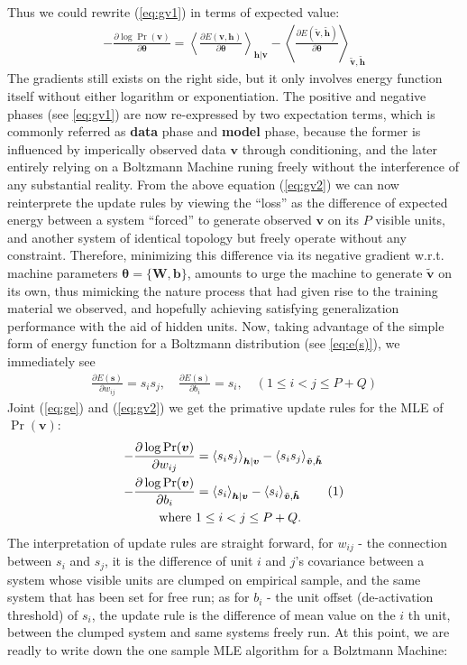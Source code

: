 \documentclass[11pt]{article}
\newcommand{\mean}[2]{\left\langle{#1}\right\rangle_{#2}}
\newcommand\numberthis{\addtocounter{equation}{1}\tag{\theequation}}
\newcommand{\vb}{\boldsymbol{b}}
\newcommand{\vh}{\boldsymbol{h}}
\newcommand{\vv}{\boldsymbol{v}}
\newcommand{\vs}{\boldsymbol{s}}
\newcommand{\mw}{\boldsymbol{W}}
\newcommand{\vht}{\tilde{\vh}}
\newcommand{\vvt}{\tilde{\vv}}
\newcommand{\pEC}{\boldsymbol{\theta}}
\newcommand{\PDV}[2]{\frac{\partial #1}{\partial #2}}
\begin{document}
Thus we could rewrite ({\ref{eq:gv1}) in terms of expected value:
\begin{align} \label{eq:gv2}
  -\PDV{\log{\Pr(\vv)}}{\pEC} = \mean{\PDV{E(\vv, \vh)}{\pEC}}{\vh|\vv} - \mean{\PDV{E(\vvt, \vht)}{\pEC}}{\vvt, \vht}
\end{align}
The gradients still exists on the right side, but it only involves energy function itself without either logarithm or exponentiation. The positive and negative phases (see \ref{eq:gv1}) are now re-expressed by two expectation terms, which is commonly referred as \textbf{data} phase and \textbf{model} phase, because the former is influenced by imperically observed data $\vv$ through conditioning, and the later entirely relying on a Boltzmann Machine runing freely without the interference of any substantial reality. From the above equation (\ref{eq:gv2}) we can now reinterprete the update rules by viewing the ``loss'' as the difference of expected energy between a system ``forced'' to generate observed $\vv$ on its $P$ visible units, and another system of identical topology but freely operate without any constraint. Therefore, minimizing this difference via its negative gradient w.r.t. machine parameters $\pEC=\{\mw, \vb\}$, amounts to urge the machine to generate $\vvt$ on its own, thus mimicking the nature process that had given rise to the training material we observed, and hopefully achieving satisfying generalization performance with the aid of hidden units.
Now, taking advantage of the simple form of energy function for a Boltzmann distribution (see \ref{eq:e(s)}), we immediately see
\begin{align} \label{eq:ge}
  \PDV{E(\vs)}{w_{ij}} = s_i s_j,  \quad \PDV{E(\vs)}{b_i} = s_i, \quad  (1 \le i < j \le P+Q)
\end{align}
Joint (\ref{eq:ge}) and (\ref{eq:gv2}) we get the primative update rules for the MLE of $\Pr(\vv)$:
\begin{align*} \label{eq:gv3}
  -\PDV{\log{\Pr(\vv)}}{w_{ij}} &= \mean{s_i s_j}{\vh|\vv} - \mean{s_i s_j}{\vvt, \vht} \\
  -\PDV{\log{\Pr(\vv)}}{b_i}    &= \mean{s_i}{\vh|\vv} - \mean{s_i}{\vvt, \vht} \numberthis \\
  \textrm{where }               & 1 \le i < j \le P+Q.
\end{align*}
The interpretation of update rules are straight forward, for $w_{ij}$ - the connection between $s_i$ and $s_j$, it is the difference of unit $i$ and $j$'s covariance between a system whose visible units are clumped on empirical sample, and the same system that has been set for free run; as for $b_i$ - the unit offset (de-activation threshold) of $s_i$, the update rule is the difference of mean value on the $i$ th unit, between the clumped system and same systems freely run. At this point, we are readly to write down the one sample MLE algorithm for a Bolztmann Machine:
}
\end{document}
